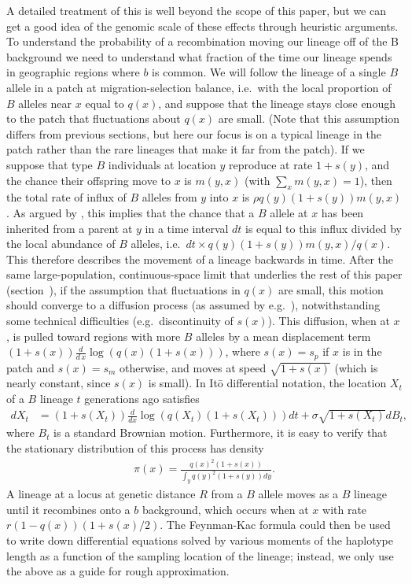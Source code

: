\documentclass{article}
\newcommand{\citet}[1]{\cite{#1}}
\begin{document}
A detailed treatment of this is well beyond the scope of this paper,
but we can get a good idea of the genomic scale of these effects through heuristic arguments.
To understand the probability of a recombination moving our lineage
off of the B background we need to understand what fraction of the
time our lineage spends in geographic regions where $b$ is common. 
We will follow the lineage of a single $B$ allele
in a patch at migration-selection balance, 
i.e.\ with the local proportion of $B$ alleles near $x$ equal to $q(x)$,
and suppose that the lineage stays close enough to the patch 
that fluctuations about $q(x)$ are small. 
(Note that this assumption differs from
previous sections, but here our focus is on a typical lineage 
in the patch rather than the rare lineages that make it far from the patch).
If we suppose that type $B$ individuals at location $y$ reproduce at rate $1+s(y)$,
and the chance their offspring move to $x$ is $m(y,x)$ (with $\sum_x m(y,x)=1$),
then the total rate of influx of $B$ alleles from $y$ into $x$ is $\rho q(y) (1+s(y)) m(y,x)$.
As argued by \citet{hudson1988coalescent}, 
this implies that the chance that a $B$ allele at $x$
has been inherited from a parent at $y$ in a time interval $dt$
is equal to this influx divided by the local abundance of $B$ alleles,
i.e.\ $dt \times q(y) (1+s(y)) m(y,x) / q(x)$.
This therefore describes the movement of a lineage backwards in time.
After the same large-population, continuous-space limit that underlies the rest of this paper (section~),
if the assumption that fluctuations in $q(x)$ are small,
this motion should converge to a diffusion process (as assumed by e.g.\ \citet{hallatschek2008surfing}),
notwithstanding some technical difficulties (e.g.\ discontinuity of $s(x)$).
This diffusion, when at $x$, 
is pulled toward regions with more $B$ alleles
by a mean displacement term $(1+s(x))\frac{d}{d\,x} \log( q(x) (1+s(x)) )$,
where $s(x)=s_p$ if $x$ is in the patch and $s(x)=s_m$ otherwise, 
and moves at speed $\sqrt{1+s(x)}$ (which is nearly constant, since $s(x)$ is small).
In It\=o differential notation, 
the location $X_t$ of a $B$ lineage $t$ generations ago satisfies
\begin{align}
    d X_t &= (1+s(X_t)) \frac{d}{dx} \log( q(X_t) (1+s(X_t)) ) dt + \sigma \sqrt{1+s(X_t)} dB_t,
\end{align}
where $B_t$ is a standard Brownian motion.
Furthermore, it is easy to verify that the stationary distribution of this process has density
\begin{align}
  \pi(x) = \frac{ q(x)^2 (1+s(x)) }{ \int_y q(y)^2 (1+s(y)) dy } . \label{eqn:lineagestatdist}
\end{align}
A lineage at a locus at genetic distance $R$ from a $B$ allele
moves as a $B$ lineage until it recombines onto a $b$ background,
which occurs when at $x$ with rate $r (1-q(x)) (1+s(x)/2)$.
The Feynman-Kac formula could then be used to write down differential equations
solved by various moments of the haplotype length as a function of the sampling location of the lineage;
instead, we only use the above as a guide for rough approximation.
\end{document}
